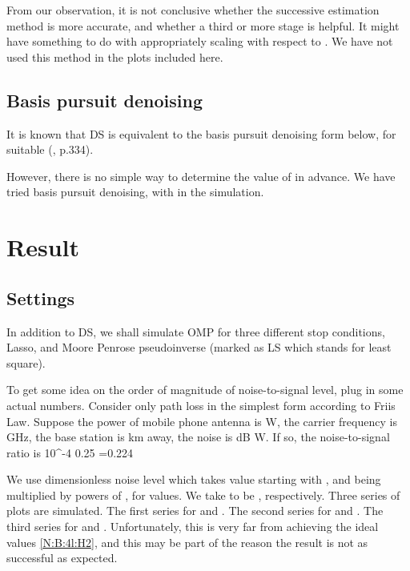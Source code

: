 From our observation, it is not conclusive whether the successive estimation method is more accurate, and whether a third or more stage is helpful.
It might have something to do with appropriately scaling  with respect to .
We have not used this method in the plots included here.

\subsection {Basis pursuit denoising}

It is known that DS is equivalent to the basis pursuit denoising form below, for suitable \m {\l} (\cite {BoV04}, p.334).


However, there is no simple way to determine the value of \m {\l} in advance.
We have tried basis pursuit denoising, with  in the simulation.

\section {Result}

\subsection {Settings}

In addition to DS, we shall simulate OMP for three different stop conditions, Lasso, and Moore Penrose pseudoinverse (marked as LS which stands for least square).

To get some idea on the order of magnitude of noise-to-signal level, plug in some actual numbers.
Consider only path loss in the simplest form according to Friis Law.
Suppose the power of mobile phone antenna is  W,
the carrier frequency is  GHz,
the base station is  km away,
the noise is  dB W.
If so, the noise-to-signal ratio is
 {
10^{-4}  {0.25} 
=0.224 
}

We use dimensionless noise level \m {\s} which takes value starting with , and being multiplied by powers of , for  values.
We take  to be , respectively.
Three series of plots are simulated.
The first series for  and .
The second series for  and .
The third series for  and .
Unfortunately, this is very far from achieving the ideal values \eqref {N:B:4l:H2}, and this may be part of the reason the result is not as successful as expected.

